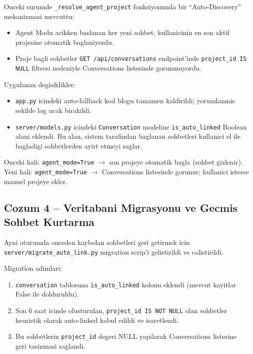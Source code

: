 \documentclass[11pt,a4paper]{article}
\begin{document}
{Onceki surumde \texttt{\_resolve\_agent\_project} fonksiyonunda bir ``Auto-Discovery'' mekanizmasi mevcuttu:
\begin{itemize}[leftmargin=1.5em]
    \item Agent Modu acikken baslanan her yeni sohbet, kullanicinin en son aktif projesine otomatik baglaniyordu.
    \item Proje bagli sohbetler \texttt{GET /api/conversations} endpoint'inde \texttt{project\_id IS NULL} filtresi nedeniyle Conversations listesinde gorunmuyordu.
\end{itemize}

Uygulanan degisiklikler:
\begin{itemize}[leftmargin=1.5em]
    \item \texttt{app.py} icindeki auto-fallback kod blogu tamamen kaldirildi; yorumlanmis sekilde log ucak birakildi.
    \item \texttt{server/models.py} icindeki \texttt{Conversation} modeline \texttt{is\_auto\_linked} Boolean alani eklendi. Bu alan, sistem tarafindan baglanan sohbetleri kullanici el ile bagladigi sohbetlerden ayirt etmeyi saglar.
\end{itemize}

\begin{notebox}
Onceki hali: \texttt{agent\_mode=True} $\rightarrow$ son projeye otomatik bagla (sohbet gizlenir).\newline
Yeni hali: \texttt{agent\_mode=True} $\rightarrow$ Conversations listesinde gorunur; kullanici isterse manuel projeye ekler.
\end{notebox}

\subsection{Cozum 4 -- Veritabani Migrasyonu ve Gecmis Sohbet Kurtarma}

Ayni oturumda onceden kaybolan sohbetleri geri getirmek icin \texttt{server/migrate\_auto\_link.py} migration scrip'i gelistirildi ve calistirildi.

Migration adimlari:
\begin{enumerate}[leftmargin=1.5em]
    \item \texttt{conversation} tablosuna \texttt{is\_auto\_linked} kolonu eklendi (mevcut kayitlar False ile dolduruldu).
    \item Son 6 saat icinde olusturulan, \texttt{project\_id IS NOT NULL} olan sohbetler heuristik olarak auto-linked kabul edildi ve isaretlendi.
    \item Bu sohbetlerin \texttt{project\_id} degeri NULL yapilarak Conversations listesine geri tasinmasi saglandi.
\end{enumerate}

}
\end{document}
